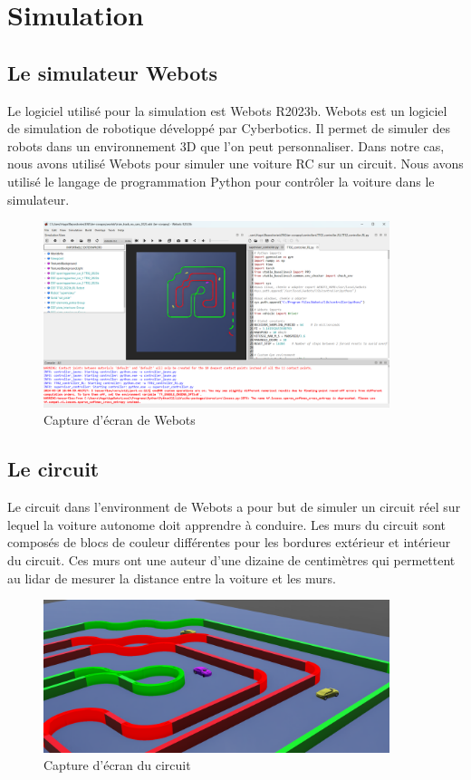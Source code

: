 \documentclass[french]{article}
\begin{document}
\section{Simulation}

\subsection{Le simulateur Webots}
Le logiciel utilisé pour la simulation est Webots R2023b. Webots est un logiciel de simulation de robotique développé 
par Cyberbotics. Il permet de simuler des robots dans un environnement 3D que l'on peut personnaliser. Dans notre cas,
nous avons utilisé Webots pour simuler une voiture RC sur un circuit. Nous avons utilisé le langage de programmation
Python pour contrôler la voiture dans le simulateur.

\begin{figure}[H]
    \centering
    \includegraphics[width=0.9\textwidth]{Images/Webots.png}
    \caption{Capture d'écran de Webots}
\end{figure}


\subsection{Le circuit}
Le circuit dans l'environment de Webots a pour but de simuler un circuit réel sur lequel la voiture autonome doit
apprendre à conduire. Les murs du circuit sont composés de blocs de couleur différentes pour les bordures extérieur et 
intérieur du circuit. Ces murs ont une auteur d'une dizaine de centimètres qui permettent au lidar de mesurer la distance
entre la voiture et les murs.

\begin{figure}[H]
    \centering
    \includegraphics[width=0.9\textwidth]{Images/Circuit.png}
    \caption{Capture d'écran du circuit}
\end{figure}
\end{document}
